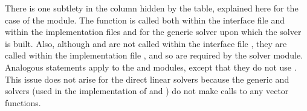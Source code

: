 There is one subtlety in the {\idaspils} column hidden by the table, explained
here for the case of the {\idaspgmr} module. 
The  function is called both within the interface file
 and within the implementation
files  and  for the generic
{\spgmr} solver upon which the {\idaspgmr} solver is built.  Also, although
 and  are not called within the interface file
, they are called within the implementation file
, and so are required by the {\idaspgmr} solver module.
Analogous statements apply to the {\idaspbcg} and {\idasptfqmr} modules,
except that they do not use .
This issue does not arise for the direct {\idas} linear solvers because
the generic {\dense} and {\band} solvers (used in the implementation of
{\idadense} and {\idaband}) do not make calls to any vector functions.


